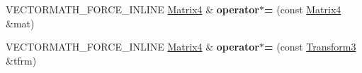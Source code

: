\begin{DoxyCompactItemize}
\item 
\hypertarget{class_vectormath_1_1_aos_1_1_matrix4_afecea56563bfecaa57607e583f344ff5}{V\+E\+C\+T\+O\+R\+M\+A\+T\+H\+\_\+\+F\+O\+R\+C\+E\+\_\+\+I\+N\+L\+I\+N\+E \hyperlink{class_vectormath_1_1_aos_1_1_matrix4}{Matrix4} \& {\bfseries operator$\ast$=} (const \hyperlink{class_vectormath_1_1_aos_1_1_matrix4}{Matrix4} \&mat)}\label{class_vectormath_1_1_aos_1_1_matrix4_afecea56563bfecaa57607e583f344ff5}

\item 
\hypertarget{class_vectormath_1_1_aos_1_1_matrix4_aef527a3bf6a07c72e7b0e39bf2f6360a}{V\+E\+C\+T\+O\+R\+M\+A\+T\+H\+\_\+\+F\+O\+R\+C\+E\+\_\+\+I\+N\+L\+I\+N\+E \hyperlink{class_vectormath_1_1_aos_1_1_matrix4}{Matrix4} \& {\bfseries operator$\ast$=} (const \hyperlink{class_vectormath_1_1_aos_1_1_transform3}{Transform3} \&tfrm)}\label{class_vectormath_1_1_aos_1_1_matrix4_aef527a3bf6a07c72e7b0e39bf2f6360a}

\end{DoxyCompactItemize}
